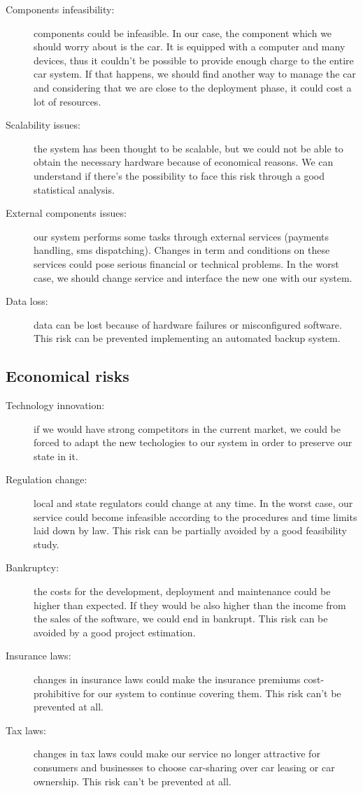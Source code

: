 \begin{description}
	\item [Components infeasibility: ] components could be infeasible. In our case, the component which we should worry about is the car. It is equipped with a computer and many devices, thus it couldn't be possible to provide enough charge to the entire car system. If that happens, we should find another way to manage the car and considering that we are close to the deployment phase, it could cost a lot of resources.
	\item [Scalability issues: ] the system has been thought to be scalable, but we could not be able to obtain the necessary hardware because of economical reasons. We can understand if there's the possibility to face this risk through a good statistical analysis.
	\item [External components issues:] our system performs some tasks through external services (payments handling, sms dispatching). Changes in term and conditions on these services could pose serious financial or technical problems. In the worst case, we should change service and interface the new one with our system.
	\item [Data loss:] data can be lost because of hardware failures or misconfigured software. This risk can be prevented implementing an automated backup system.
\end{description}


\subsection {Economical risks}

\begin{description}
	\item [Technology innovation:] if we would have strong competitors in the current market, we could be forced to adapt the new techologies to our system in order to preserve our state in it.
	\item [Regulation change:] local and state regulators could change at any time. In the worst case, our service could become infeasible according to the procedures and time limits laid down by law. This risk can be partially avoided by a good feasibility study.
	\item [Bankruptcy:] the costs for the development, deployment and maintenance could be higher than expected. If they would be also higher than the income from the sales of the software, we could end in bankrupt. This risk can be avoided by a good project estimation.
	\item [Insurance laws:] changes in insurance laws could make the insurance premiums cost-prohibitive for our system to continue covering them. This risk can't be prevented at all.
	\item [Tax laws:] changes in tax laws could make our service no longer attractive for consumers and businesses to choose car-sharing over car leasing or car ownership. This risk can't be prevented at all.
\end{description}